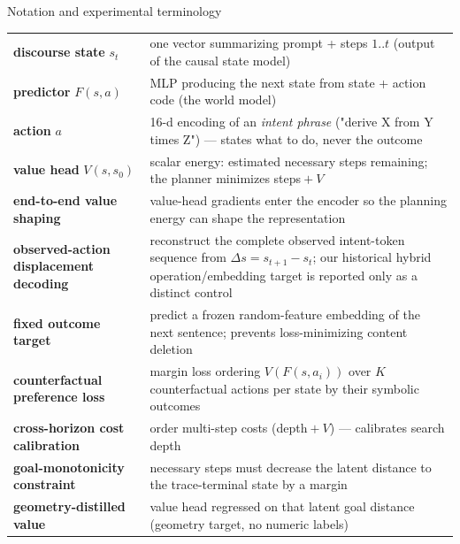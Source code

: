 \documentclass[aspectratio=169,10pt]{beamer}
\begin{document}
\begin{frame}{Notation and experimental terminology}
\footnotesize
\begin{tabular}{p{}p{}}
\toprule
\textbf{discourse state} $s_t$ & one vector summarizing prompt + steps
  $1..t$ (output of the causal state model)\\
\textbf{predictor} $F(s,a)$ & MLP producing the next state from state +
  action code (the world model)\\
\textbf{action} $a$ & 16-d encoding of an \emph{intent phrase} ("derive X
  from Y times Z") --- states what to do, never the outcome\\
\textbf{value head} $V(s, s_0)$ & scalar energy: estimated necessary steps
  remaining; the planner minimizes steps${}+V$\\
\textbf{end-to-end value shaping} & value-head gradients enter the encoder
  so the planning energy can shape the representation\\
\textbf{observed-action displacement decoding} & reconstruct the complete
  observed intent-token sequence from $\Delta s=s_{t+1}-s_t$; our historical
  hybrid operation/embedding target is reported only as a distinct control\\
\textbf{fixed outcome target} & predict a frozen random-feature embedding
  of the next sentence; prevents loss-minimizing content deletion\\
\textbf{counterfactual preference loss} & margin loss ordering $V(F(s,a_i))$ over $K$
  counterfactual actions per state by their symbolic outcomes\\
\textbf{cross-horizon cost calibration} & order multi-step costs (depth${}+V$) ---
  calibrates search depth\\
\textbf{goal-monotonicity constraint} & necessary steps must decrease the latent
  distance to the trace-terminal state by a margin\\
\textbf{geometry-distilled value} & value head regressed on that latent goal
  distance (geometry target, no numeric labels)\\
\bottomrule
\end{tabular}

\end{frame}
\end{document}
